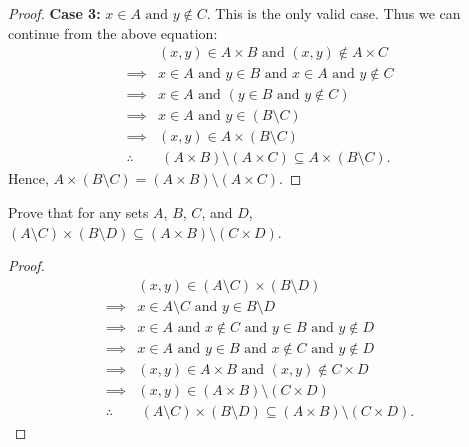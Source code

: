 \documentclass[12pt]{article}
\newenvironment{exercise}[2][Exercise]{\begin{trivlist}
\item[\hskip \labelsep {\bfseries #1}\hskip \labelsep {\bfseries #2.}]}{\end{trivlist}}
\newcommand{\nd}{\text{ and }}
\begin{document}
\begin{proof}
	\textbf{Case 3:} \( x \in A \nd y \notin C \). This is the only valid case. Thus we can continue from the above equation:
	\begin{align*}
		           & (x,y) \in A\times B \nd (x,y) \notin A\times C                      \\
		\implies   & x \in A \nd y \in B \nd x \in A \nd y \notin C                      \\
		\implies   & x \in A \nd (y \in B \nd y \notin C)                                \\
		\implies   & x \in A \nd y \in (B\setminus C)                                    \\
		\implies   & (x,y)\in A\times (B\setminus C)                                     \\
		\therefore & \ (A\times B)\setminus (A\times C)\subseteq A\times (B\setminus C).
	\end{align*}
	Hence, \( A\times (B\setminus C)=(A\times B)\setminus (A\times C) \).
\end{proof}

\begin{exercise}
	{10}
	Prove that for any sets \( A \), \( B \), \( C \), and \( D \), \( (A \setminus C) \times (B \setminus D) \subseteq (A \times B) \setminus (C \times D) \).
\end{exercise}

\begin{proof}
	\begin{align*}
		           & (x,y)\in (A\setminus C)\times (B\setminus D)                                     \\
		\implies   & x\in A\setminus C \nd y\in B\setminus D                                          \\
		\implies   & x\in A \nd x\notin C \nd y\in B \nd y\notin D                                    \\
		\implies   & x\in A\nd y\in B\nd x\notin C\nd y\notin D                                       \\
		\implies   & (x,y)\in A\times B\nd (x,y)\notin C\times D                                      \\
		\implies   & (x,y)\in (A\times B)\setminus (C\times D)                                        \\
		\therefore & \ (A\setminus C)\times (B\setminus D)\subseteq (A\times B)\setminus (C\times D).
	\end{align*}
\end{proof}
\end{document}
